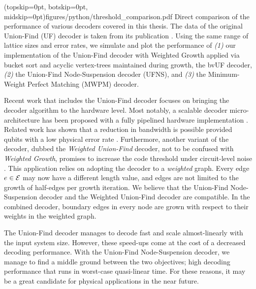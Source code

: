 \Figure[htb!](topskip=0pt, botskip=0pt, midskip=0pt){figures/python/threshold_comparison.pdf}{
  Direct comparison of the performance of various decoders covered in this thesis. The data of the original Union-Find (UF) decoder is taken from its publication \cite{delfosse2017almost}. Using the same range of lattice sizes and error rates, we simulate and plot the performance of \emph{(1)} our implementation of the Union-Find decoder with Weighted Growth applied via bucket sort and acyclic vertex-trees maintained during growth, the bvUF decoder, \emph{(2)} the Union-Find Node-Suspension decoder (UFNS), and  \emph{(3)} the Minimum-Weight Perfect Matching (MWPM) decoder.\label{thres_comp}}

Recent work that includes the Union-Find decoder focuses on bringing the decoder algorithm to the hardware level. Most notably, a scalable decoder micro-architecture has been proposed with a fully pipelined hardware implementation \cite{das2020scalable}. Related work has shown that a reduction in bandwidth is possible provided qubits with a low physical error rate \cite{delfosse2020hierarchical}. Furthermore, another variant of the decoder, dubbed the \emph{Weighted Union-Find} decoder, not to be confused with \emph{Weighted Growth}, promises to increase the code threshold under circuit-level noise \cite{huang2020fault}. This application relies on adopting the decoder to a \emph{weighted} graph. Every edge $e\in\mathcal{E}$ may now have a different length value, and edges are not limited to the growth of half-edges per growth iteration. We believe that the Union-Find Node-Suspension decoder and the Weighted Union-Find decoder are compatible. In the combined decoder, boundary edges in every node are grown with respect to their weights in the weighted graph. 

The Union-Find decoder manages to decode fast and scale almost-linearly with the input system size. However, these speed-ups come at the cost of a decreased decoding performance. With the Union-Find Node-Suspension decoder, we manage to find a middle ground between the two objectives; high decoding performance that runs in worst-case quasi-linear time. For these reasons, it may be a great candidate for physical applications in the near future.


